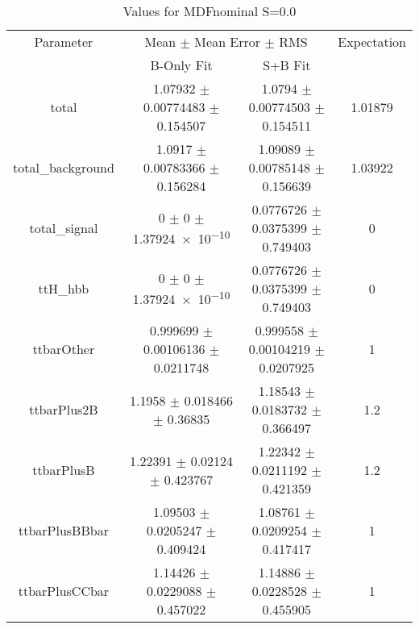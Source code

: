 \begin{table}
\centering
\caption{Values for MDFnominal S=0.0}
\begin{tabular}{cccc}
\toprule
Parameter & \multicolumn{2}{c}{Mean $\pm$ Mean Error $\pm$ RMS} & Expectation\\
 & B-Only Fit & S+B Fit & \\
\midrule
total & \num{1.07932} $\pm$ \num{0.00774483} $\pm$ \num{0.154507} & \num{1.0794} $\pm$ \num{0.00774503} $\pm$ \num{0.154511} & \num{1.01879}\\
total\_background & \num{1.0917} $\pm$ \num{0.00783366} $\pm$ \num{0.156284} & \num{1.09089} $\pm$ \num{0.00785148} $\pm$ \num{0.156639} & \num{1.03922}\\
total\_signal & \num{0} $\pm$ \num{0} $\pm$ \num{1.37924e-10} & \num{0.0776726} $\pm$ \num{0.0375399} $\pm$ \num{0.749403} & \num{0}\\
ttH\_hbb & \num{0} $\pm$ \num{0} $\pm$ \num{1.37924e-10} & \num{0.0776726} $\pm$ \num{0.0375399} $\pm$ \num{0.749403} & \num{0}\\
ttbarOther & \num{0.999699} $\pm$ \num{0.00106136} $\pm$ \num{0.0211748} & \num{0.999558} $\pm$ \num{0.00104219} $\pm$ \num{0.0207925} & \num{1}\\
ttbarPlus2B & \num{1.1958} $\pm$ \num{0.018466} $\pm$ \num{0.36835} & \num{1.18543} $\pm$ \num{0.0183732} $\pm$ \num{0.366497} & \num{1.2}\\
ttbarPlusB & \num{1.22391} $\pm$ \num{0.02124} $\pm$ \num{0.423767} & \num{1.22342} $\pm$ \num{0.0211192} $\pm$ \num{0.421359} & \num{1.2}\\
ttbarPlusBBbar & \num{1.09503} $\pm$ \num{0.0205247} $\pm$ \num{0.409424} & \num{1.08761} $\pm$ \num{0.0209254} $\pm$ \num{0.417417} & \num{1}\\
ttbarPlusCCbar & \num{1.14426} $\pm$ \num{0.0229088} $\pm$ \num{0.457022} & \num{1.14886} $\pm$ \num{0.0228528} $\pm$ \num{0.455905} & \num{1}\\
\bottomrule
\end{tabular}
\end{table}